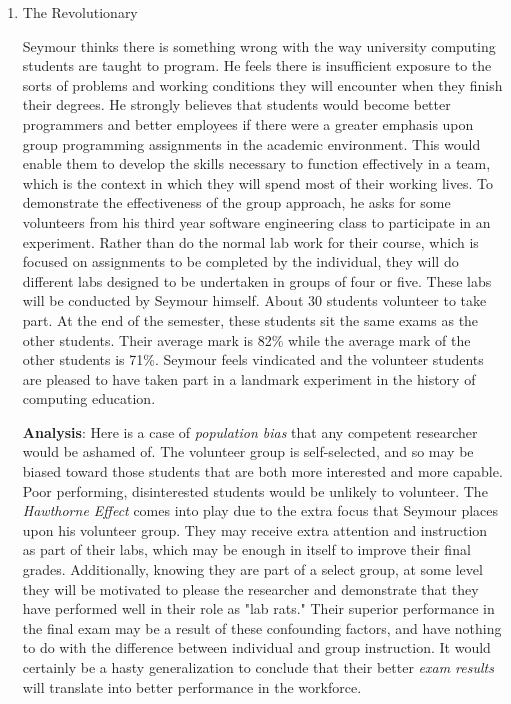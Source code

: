 \documentclass{article}
\begin{document}
\begin{enumerate}
\begin{enumerate}
\item The Revolutionary
\label{sec:orgheadline376}

Seymour thinks there is something wrong with the way university
computing students are taught to program. He feels there is insufficient
exposure to the sorts of problems and working conditions they will
encounter when they finish their degrees. He strongly believes that
students would become better programmers and better employees if there
were a greater emphasis upon group programming assignments in the
academic environment. This would enable them to develop the skills
necessary to function effectively in a team, which is the context in
which they will spend most of their working lives. To demonstrate the
effectiveness of the group approach, he asks for some volunteers from
his third year software engineering class to participate in an
experiment. Rather than do the normal lab work for their course, which
is focused on assignments to be completed by the individual, they will
do different labs designed to be undertaken in groups of four or five.
These labs will be conducted by Seymour himself. About 30 students
volunteer to take part. At the end of the semester, these students sit
the same exams as the other students. Their average mark is 82\% while
the average mark of the other students is 71\%. Seymour feels vindicated
and the volunteer students are pleased to have taken part in a landmark
experiment in the history of computing education.

\textbf{Analysis}: Here is a case of \emph{population bias} that any competent
researcher would be ashamed of. The volunteer group is self-selected,
and so may be biased toward those students that are both more interested
and more capable. Poor performing, disinterested students would be
unlikely to volunteer. The \emph{Hawthorne Effect} comes into play due to the
extra focus that Seymour places upon his volunteer group. They may
receive extra attention and instruction as part of their labs, which may
be enough in itself to improve their final grades. Additionally, knowing
they are part of a select group, at some level they will be motivated to
please the researcher and demonstrate that they have performed well in
their role as "lab rats." Their superior performance in the final exam
may be a result of these confounding factors, and have nothing to do
with the difference between individual and group instruction. It would
certainly be a hasty generalization to conclude that their better \emph{exam
results} will translate into better performance in the workforce.
\end{enumerate}


\end{enumerate}
\end{document}
